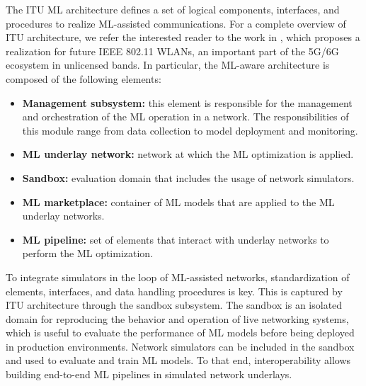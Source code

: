 \documentclass[journal]{IEEEtran}
\begin{document}
    The ITU ML architecture defines a set of logical components, interfaces, and procedures to realize ML-assisted communications. For a complete overview of ITU architecture, we refer the interested reader to the work in \cite{itu_architecture}, which proposes a realization for future IEEE 802.11 WLANs, an important part of the 5G/6G ecosystem in unlicensed bands. In particular, the ML-aware architecture is composed of the following elements:
	\begin{itemize}
		\item \textbf{Management subsystem:} this element is responsible for the management and orchestration of the ML operation in a network. The responsibilities of this module range from data collection to model deployment and monitoring.
		\item \textbf{ML underlay network:} network at which the ML optimization is applied.
		\item \textbf{Sandbox:} evaluation domain that includes the usage of network simulators.
		\item \textbf{ML marketplace:} container of ML models that are applied to the ML underlay networks.
		\item \textbf{ML pipeline:} set of elements that interact with underlay networks to perform the ML optimization. 
	\end{itemize} 
	
	To integrate simulators in the loop of ML-assisted networks, standardization of elements, interfaces, and data handling procedures is key. This is captured by ITU architecture through the sandbox subsystem. The sandbox is an isolated domain for reproducing the behavior and operation of live networking systems, which is useful to evaluate the performance of ML models before being deployed in production environments. Network simulators can be included in the sandbox and used to evaluate and train ML models. To that end, interoperability allows building end-to-end ML pipelines in simulated network underlays.
	
\end{document}
